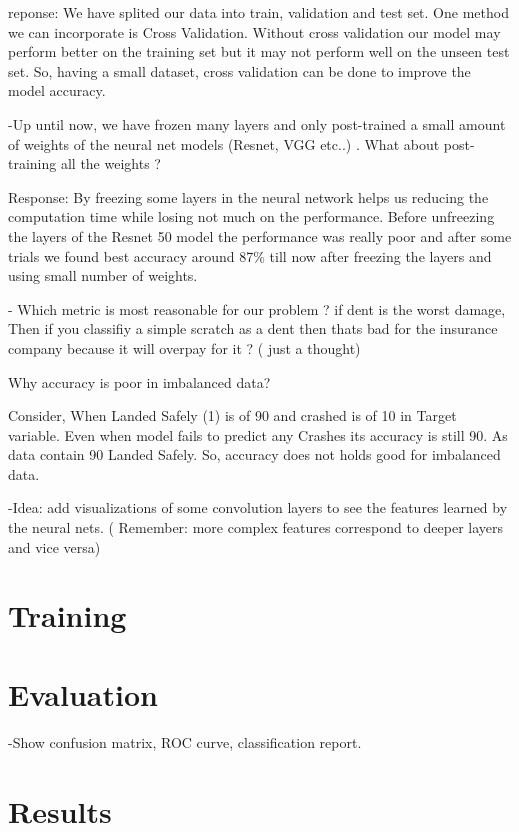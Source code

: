\documentclass[lang=english,inputenc=utf8,fontsize=10pt]{ldvarticle}
\begin{document}
reponse:
We have splited our data into train, validation and test set. One method we can incorporate is Cross Validation. Without cross validation our model may perform better on the training set but it may not perform well on the unseen test set. So, having a small dataset, cross validation can be done to improve the model accuracy. 

-Up until now, we have frozen many layers and only post-trained a small amount of weights of the neural net models (Resnet, VGG etc..) . What about post-training all the weights ?

Response: By freezing some layers in the neural network helps us reducing the computation time while losing not much on the performance. Before unfreezing the layers of the Resnet 50 model the performance was really poor and after some trials we found best accuracy around 87\% till now after freezing the layers and using small number of weights.

- Which metric is most reasonable for our problem ? if dent is the worst damage, Then if you classifiy a simple scratch as a dent then thats bad for the insurance company because it will overpay for it ? ( just a thought)

Why accuracy is poor in imbalanced data?

Consider, When Landed Safely (1) is of 90 and crashed is of 10 in Target variable. Even when model fails to predict any Crashes its accuracy is still 90. As data contain 90 Landed Safely. So, accuracy does not holds good for imbalanced data.

-Idea: add visualizations of some convolution layers to see the features learned by the neural nets. ( Remember: more complex features correspond to deeper layers and vice versa)

\section*{Training}

\lipsum[11]

\section*{Evaluation}

-Show confusion matrix, ROC curve, classification report.

\newpage

\section{Results}
\end{document}
